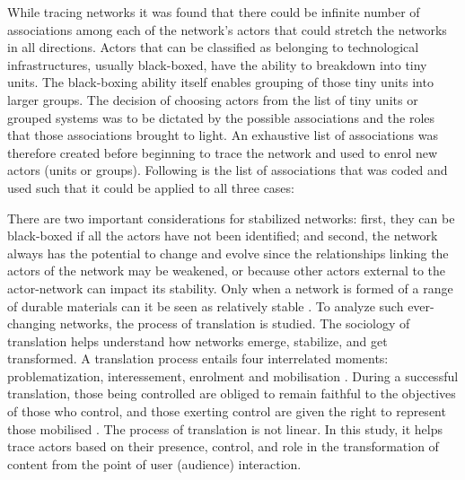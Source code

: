 While tracing networks it was found that there could be infinite number of associations among each of the network's actors that could stretch the networks in all directions. Actors that can be classified as belonging to technological infrastructures, usually black-boxed, have the ability to breakdown into tiny units. The black-boxing ability itself enables grouping of those tiny units into larger groups. The decision of choosing actors from the list of tiny units or grouped systems was to be dictated by the possible associations and the roles that those associations brought to light. An exhaustive list of associations was therefore created before beginning to trace the network and used to enrol new actors (units or groups). Following is the list of associations that was coded and used such that it could be applied to all three cases:

There are two important considerations for stabilized networks: first, they can be black-boxed if all the actors have not been identified; and second, the network always has the potential to change and evolve since the relationships linking the actors of the network may be weakened, or because other actors external to the actor-network can impact its stability. Only when a network is formed of a range of durable materials can it be seen as relatively stable \cite{law1992notes}. To analyze such ever-changing networks, the process of translation is studied. The sociology of translation helps understand how networks emerge, stabilize, and get transformed. A translation process entails four interrelated moments: problematization, interessement, enrolment and mobilisation \cite{callon1986sociology}. During a successful translation, those being controlled are obliged to remain faithful to the objectives of those who control, and those exerting control are given the right to represent those mobilised \cite{callon1986sociology}. The process of translation is not linear. In this study, it helps trace actors based on their presence, control, and role in the transformation of content from the point of user (audience) interaction.

